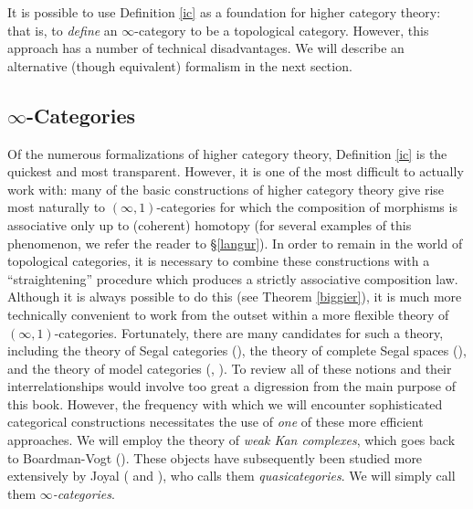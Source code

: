 It is possible to use Definition \ref{ic} as a foundation for higher category theory: that is, to {\em define} an $\infty$-category to be a topological category. However, this approach has a number of technical disadvantages. We will describe an alternative (though equivalent) formalism in the next section.

\subsection{$\infty$-Categories}\label{qqqc}

Of the numerous formalizations of higher category theory, Definition \ref{ic} is the quickest and most transparent. However, it is one of the most difficult to actually work with: many of the basic constructions of higher category theory give rise most naturally to $(\infty,1)$-categories for which the composition of
morphisms is associative only up to (coherent) homotopy (for several examples of this phenomenon, we refer the reader to \S \ref{langur}). In order to remain in the world of topological categories, it is necessary to combine these constructions with a ``straightening'' procedure which
produces a strictly associative composition law. Although it is always possible to do this
(see Theorem \ref{biggier}), it is much more technically convenient to work from the outset
within a more flexible theory of $(\infty,1)$-categories. Fortunately, there are many candidates
for such a theory, including the theory of Segal categories (\cite{simpson2}), the theory of complete Segal spaces (\cite{completesegal}), and the theory of model categories (\cite{hovey}, \cite{hirschhorn}).
To review all of these notions and their interrelationships would
involve too great a digression from the main purpose of this book.
However, the frequency with which we will encounter sophisticated
categorical constructions necessitates the use of {\em one} of
these more efficient approaches. We will employ the theory of {\it weak Kan complexes}, which goes back to Boardman-Vogt (\cite{quasicat}). These objects have subsequently been studied more extensively by Joyal (\cite{joyalpub} and \cite{joyalnotpub}), who calls them {\it quasicategories}. We will simply call them {\it $\infty$-categories}.

